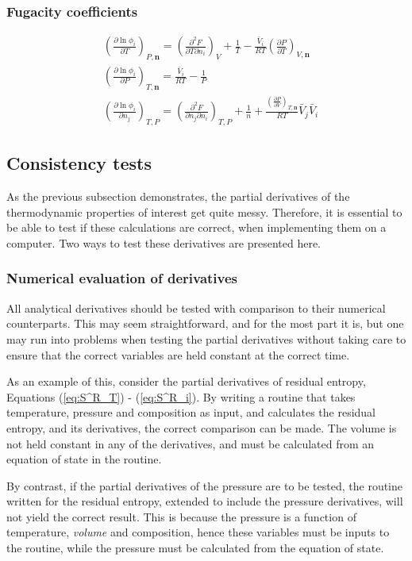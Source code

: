 \documentclass[english]{../thermomemo/thermomemo}
\numberwithin{equation}{section}
\newcommand*{\pder}[2]{\left(\frac{\partial #1}{\partial #2}\right)}
\newcommand*{\pdcross}[3]{\left(\frac{\partial^2 #1}{\partial #2 \partial #3}\right)}
\newcommand*{\reff}[1]{(\ref{#1})}
\begin{document}
\subsubsection*{Fugacity coefficients}
\begin{align}
\label{eq:lnphi_T}
& \pder{\ln \phi_i}{T}_{P, \textbf{n}} = \pdcross{F}{T}{n_i}_V + \frac{1}{T} - \frac{\bar{V}_i}{RT}  \pder{P}{T}_{V,\textbf{n}} \\
\label{eq:lnphi_P}
& \pder{\ln \phi_i}{P}_{T, \textbf{n}} = \frac{\bar{V}_i}{RT} - \frac{1}{P} \\
\label{eq:lnphi_i}
& \pder{\ln \phi_i}{n_j}_{T, P}  = \pdcross{F}{n_j}{n_i}_{T,P} + \frac{1}{n} + \frac{\pder{P}{V}_{T,\textbf{n}}}{RT} \bar{V}_j \bar{V}_i 
\end{align}

\subsection{Consistency tests}
\label{subsec:consistCheck}
As the previous subsection demonstrates, the partial derivatives of the thermodynamic properties of interest get quite messy. Therefore, it is essential to be able to test if these calculations are correct, when implementing them on a computer. Two ways to test these derivatives are presented here.

\subsubsection*{Numerical evaluation of derivatives}
All analytical derivatives should be tested with comparison to their numerical counterparts. This may seem straightforward, and for the most part it is, but one may run into problems when testing the partial derivatives without taking care to ensure that the correct variables are held constant at the correct time. 

As an example of this, consider the partial derivatives of residual entropy, Equations \reff{eq:S^R_T} - \reff{eq:S^R_i}. By writing a routine that takes temperature, pressure and composition as input, and calculates the residual entropy, and its derivatives, the correct comparison can be made. The volume is not held constant in any of the derivatives, and must be calculated from an equation of state in the routine.

By contrast, if the partial derivatives of the pressure are to be tested, the routine written for the residual entropy, extended to include the pressure derivatives, will not yield the correct result. This is because the pressure is a function of temperature, \textit{volume} and composition, hence these variables must be inputs to the routine, while the pressure must be calculated from the equation of state.
\end{document}

